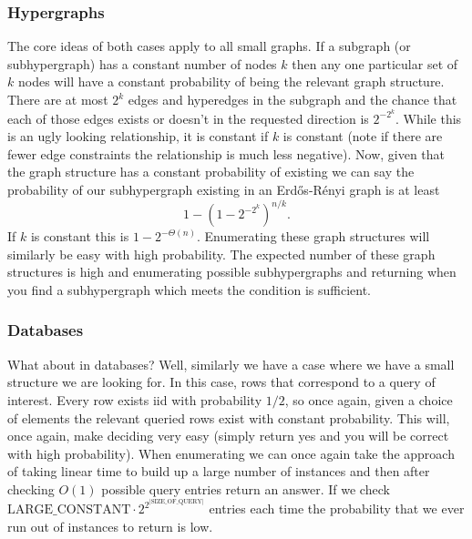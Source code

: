 \documentclass[11pt,letterpaper,pdftex]{article}
\begin{document}
\subsubsection{Hypergraphs}
The core ideas of both cases apply to all small graphs. If a subgraph (or subhypergraph) has a constant number of nodes $k$ then any one particular set of $k$ nodes will have a constant probability of being the relevant graph structure. There are at most $2^k$ edges and hyperedges in the subgraph and the chance that each of those edges exists or doesn't in the requested direction is $2^{-2^k}$. While this is an ugly looking relationship, it is constant if $k$ is constant (note if there are fewer edge constraints the relationship is much less negative). Now, given that the graph structure has a constant probability of existing we can say the probability of our subhypergraph existing in an Erd{\H{o}}s-R{\'{e}}nyi graph is at least 
$$1- (1 -2^{-2^k})^{n/k}.$$
If $k$ is constant this is $1 - 2^{-\Theta(n)}$. Enumerating these graph structures will similarly be easy with high probability. The expected number of these graph structures is high and enumerating possible subhypergraphs and returning when you find a subhypergraph which meets the condition is sufficient. 


\subsubsection{Databases}
What about in databases? Well, similarly we have a case where we have a small structure we are looking for. In this case, rows that correspond to a query of interest. Every row exists iid with probability $1/2$, so once again, given a choice of elements the relevant queried rows exist with constant probability. This will, once again, make deciding very easy (simply return yes and you will be correct with high probability). When enumerating we can once again take the approach of taking linear time to build up a large number of instances and then after checking $O(1)$ possible query entries return an answer. If we check $\text{LARGE\_CONSTANT} \cdot 2^{2^|\text{SIZE\_OF\_QUERY}|}$ entries each time the probability that we ever run out of instances to return is low. 
 
\end{document}
